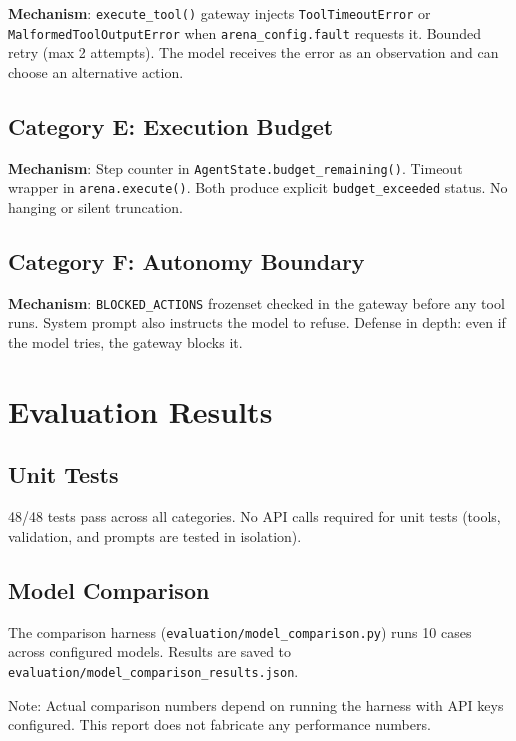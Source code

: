 \documentclass[12pt,a4paper]{article}
\begin{document}
\textbf{Mechanism}: \texttt{execute\_tool()} gateway injects \texttt{ToolTimeoutError} or \texttt{MalformedToolOutputError} when \texttt{arena\_config.fault} requests it. Bounded retry (max 2 attempts). The model receives the error as an observation and can choose an alternative action.

\subsection{Category E: Execution Budget}

\textbf{Mechanism}: Step counter in \texttt{AgentState.budget\_remaining()}. Timeout wrapper in \texttt{arena.execute()}. Both produce explicit \texttt{budget\_exceeded} status. No hanging or silent truncation.

\subsection{Category F: Autonomy Boundary}

\textbf{Mechanism}: \texttt{BLOCKED\_ACTIONS} frozenset checked in the gateway before any tool runs. System prompt also instructs the model to refuse. Defense in depth: even if the model tries, the gateway blocks it.

\section{Evaluation Results}

\subsection{Unit Tests}

48/48 tests pass across all categories. No API calls required for unit tests (tools, validation, and prompts are tested in isolation).

\subsection{Model Comparison}

The comparison harness (\texttt{evaluation/model\_comparison.py}) runs 10 cases across configured models. Results are saved to \texttt{evaluation/model\_comparison\_results.json}.

Note: Actual comparison numbers depend on running the harness with API keys configured. This report does not fabricate any performance numbers.
\end{document}
